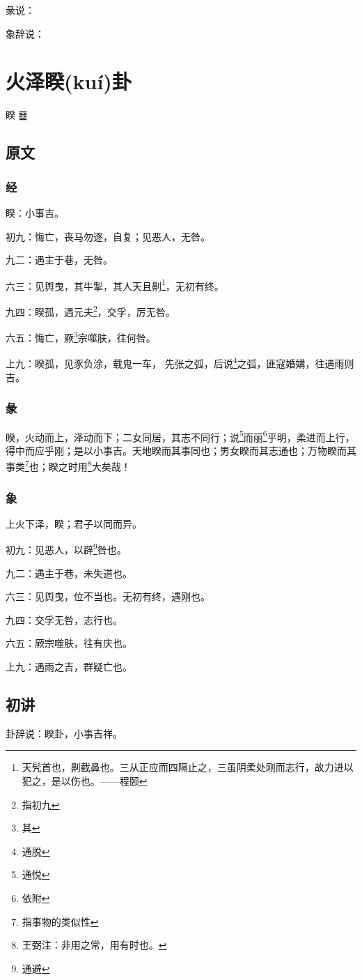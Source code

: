 \documentclass[12pt,oneside]{book}
\begin{document}
彖说：

象辞说：

\chapter{火泽睽(kuí)卦}
睽 {\Large ䷥}

\section{原文}

\subsection{经}
睽：小事吉。

初九：悔亡，丧马勿逐，自复；见恶人，无咎。

九二：遇主于巷，无咎。

六三：见舆曳，其牛掣，其人天且劓\footnote{天髠首也，劓截鼻也。三从正应而四隔止之，三虽阴柔处刚而志行，故力进以犯之，是以伤也。——程颐}，无初有终。

九四：睽孤，遇元夫\footnote{指初九}，交孚，厉无咎。

六五：悔亡，厥\footnote{其}宗噬肤，往何咎。

上九：睽孤，见豕负涂，载鬼一车， 先张之弧，后说\footnote{通脱}之弧，匪寇婚媾，往遇雨则吉。

\subsection{彖}
睽，火动而上，泽动而下；二女同居，其志不同行；说\footnote{通悦}而丽\footnote{依附}乎明，柔进而上行，得中而应乎刚；是以小事吉。天地睽而其事同也；男女睽而其志通也；万物睽而其事类\footnote{指事物的类似性}也；睽之时用\footnote{王弼注：非用之常，用有时也。}大矣哉！

\subsection{象}
上火下泽，睽；君子以同而异。

初九：见恶人，以辟\footnote{通避}咎也。

九二：遇主于巷，未失道也。

六三：见舆曳，位不当也。无初有终，遇刚也。

九四：交孚无咎，志行也。

六五：厥宗噬肤，往有庆也。

上九：遇雨之吉，群疑亡也。

\section{初讲}
卦辞说：睽卦，小事吉祥。
\end{document}
